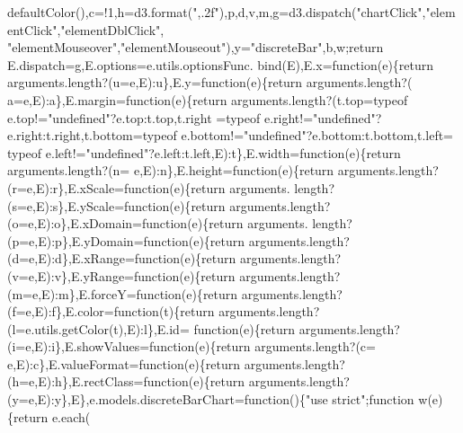 \begin{DoxyCode}
      defaultColor(),c=!1,h=d3.format(\textcolor{stringliteral}{",.2f"}),p,d,v,m,g=d3.dispatch(\textcolor{stringliteral}{"chartClick"},\textcolor{stringliteral}{"elementClick"},\textcolor{stringliteral}{"elementDblClick"},\textcolor{stringliteral}{
      "elementMouseover"},\textcolor{stringliteral}{"elementMouseout"}),y=\textcolor{stringliteral}{"discreteBar"},b,w;\textcolor{keywordflow}{return} E.dispatch=g,E.options=e.utils.optionsFunc.
      bind(E),E.x=\textcolor{keyword}{function}(e)\{\textcolor{keywordflow}{return} arguments.length?(u=e,E):u\},E.y=\textcolor{keyword}{function}(e)\{\textcolor{keywordflow}{return} arguments.length?(
      a=e,E):a\},E.margin=\textcolor{keyword}{function}(e)\{\textcolor{keywordflow}{return} arguments.length?(t.top=typeof e.top!=\textcolor{stringliteral}{"undefined"}?e.top:t.top,t.right
      =typeof e.right!=\textcolor{stringliteral}{"undefined"}?e.right:t.right,t.bottom=typeof e.bottom!=\textcolor{stringliteral}{"undefined"}?e.bottom:t.bottom,t.left=
      typeof e.left!=\textcolor{stringliteral}{"undefined"}?e.left:t.left,E):t\},E.width=\textcolor{keyword}{function}(e)\{\textcolor{keywordflow}{return} arguments.length?(n=
      e,E):n\},E.height=\textcolor{keyword}{function}(e)\{\textcolor{keywordflow}{return} arguments.length?(r=e,E):r\},E.xScale=\textcolor{keyword}{function}(e)\{\textcolor{keywordflow}{return} arguments.
      length?(s=e,E):s\},E.yScale=\textcolor{keyword}{function}(e)\{\textcolor{keywordflow}{return} arguments.length?(o=e,E):o\},E.xDomain=\textcolor{keyword}{function}(e)\{\textcolor{keywordflow}{return} arguments.
      length?(p=e,E):p\},E.yDomain=\textcolor{keyword}{function}(e)\{\textcolor{keywordflow}{return} arguments.length?(d=e,E):d\},E.xRange=\textcolor{keyword}{function}(e)\{\textcolor{keywordflow}{return} 
      arguments.length?(v=e,E):v\},E.yRange=\textcolor{keyword}{function}(e)\{\textcolor{keywordflow}{return} arguments.length?(m=e,E):m\},E.forceY=\textcolor{keyword}{function}(e)\{\textcolor{keywordflow}{return} 
      arguments.length?(f=e,E):f\},E.color=\textcolor{keyword}{function}(t)\{\textcolor{keywordflow}{return} arguments.length?(l=e.utils.getColor(t),E):l\},E.id=\textcolor{keyword}{
      function}(e)\{\textcolor{keywordflow}{return} arguments.length?(i=e,E):i\},E.showValues=\textcolor{keyword}{function}(e)\{\textcolor{keywordflow}{return} arguments.length?(c=
      e,E):c\},E.valueFormat=\textcolor{keyword}{function}(e)\{\textcolor{keywordflow}{return} arguments.length?(h=e,E):h\},E.rectClass=\textcolor{keyword}{function}(e)\{\textcolor{keywordflow}{return} 
      arguments.length?(y=e,E):y\},E\},e.models.discreteBarChart=\textcolor{keyword}{function}()\{\textcolor{stringliteral}{"use strict"};\textcolor{keyword}{function} w(e)\{\textcolor{keywordflow}{return} e.each(\textcolor{keyword}{
}
\end{DoxyCode}
